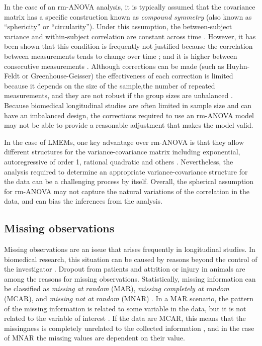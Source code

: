 \documentclass[Royal,times,doublespace,sagev]{sagej}
\begin{document}
In the case of an rm-ANOVA analysis, it is typically assumed that the covariance matrix has a specific construction known as \emph{compound symmetry} (also known as ``sphericity'' or ``circularity''). Under this assumption, the between-subject variance and within-subject correlation are constant across time \cite{weiss2005, geisser1958, huynh1976}. However, it has been shown that this condition is frequently not justified because the correlation between measurements tends to change over time \cite{maxwell2017}; and it is higher between consecutive measurements \cite{gueorguieva2004, ugrinowitsch2004}. Although corrections can be made (such as Huyhn-Feldt or Greenhouse-Geisser)\cite{huynh1976, greenhouse1959} the effectiveness of each correction is limited because it depends on the size of the sample,the number of repeated measurements\cite{haverkamp2017}, and they are not robust if the group sizes are unbalanced \cite{keselman2001}. Because biomedical longitudinal studies are often limited in sample size and can have an imbalanced design, the corrections required to use an rm-ANOVA model may not be able to provide a reasonable adjustment that makes the model valid.

In the case of LMEMs, one key advantage over rm-ANOVA is that they allow different structures for the variance-covariance matrix including exponential, autoregressive of order 1, rational quadratic and others \cite{pinheiro2006}. Nevertheless, the analysis required to determine an appropriate variance-covariance structure for the data can be a challenging process by itself. Overall, the spherical assumption for rm-ANOVA may not capture the natural variations of the correlation in the data, and can bias the inferences from the analysis.

\hypertarget{missing-observations}{%
\subsection{Missing observations}\label{missing-observations}}

Missing observations are an issue that arises frequently in longitudinal studies. In biomedical research, this situation can be caused by reasons beyond the control of the investigator \cite{molenberghs2004}. Dropout from patients and attrition or injury in animals are among the reasons for missing observations. Statistically, missing information can be classified as \emph{missing at random} (MAR), \emph{missing completely at random} (MCAR), and \emph{missing not at random} (MNAR) \cite{weiss2005}. In a MAR scenario, the pattern of the missing information is related to some variable in the data, but it is not related to the variable of interest \cite{scheffer2002}. If the data are MCAR, this means that the missingness is completely unrelated to the collected information \cite{potthoff2006}, and in the case of MNAR the missing values are dependent on their value.
\end{document}
